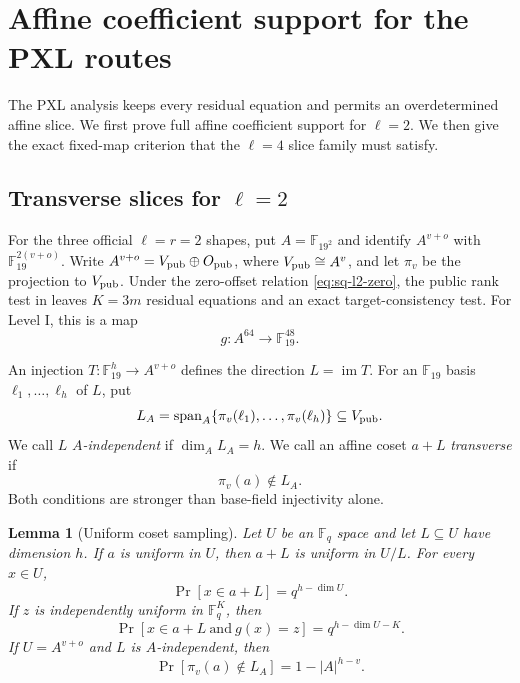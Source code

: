 \documentclass[11pt]{article}
\newtheorem{lemma}[lemma]{Lemma}
\newcommand{\F}{\mathbb F}
\newcommand{\Span}{\operatorname{span}}
\newcommand{\im}{\operatorname{im}}
\begin{document}
\section{Affine coefficient support for the PXL routes}
\label{sec:pxl-support}

The PXL analysis keeps every residual equation and permits an
overdetermined affine slice.  We first prove full affine coefficient support
for $\ell=2$.  We then give the exact fixed-map criterion that the
$\ell=4$ slice family must satisfy.

\subsection{Transverse slices for \texorpdfstring{$\ell=2$}{ell=2}}
\label{sec:pxl-l2-slice}

For the three official $\ell=r=2$ shapes, put
$A=\F_{19^2}$ and identify $A^{v+o}$ with
$\F_{19}^{2(v+o)}$.  Write
$A^{v+o}=V_{\rm pub}\oplus O_{\rm pub}$, where
$V_{\rm pub}\cong A^v$, and let $\pi_v$ be the projection to
$V_{\rm pub}$.  Under the zero-offset relation
\eqref{eq:sq-l2-zero}, the public rank test in
 leaves $K=3m$ residual equations and an exact
target-consistency test.  For Level I, this is a map
\begin{equation}
 g:A^{64}\longrightarrow\F_{19}^{48}.              \label{eq:pxl-level1-residual}
\end{equation}

An injection $T:\F_{19}^{h}\to A^{v+o}$ defines the direction
$L=\im T$.  For an $\F_{19}$ basis
$\ell_1,\ldots,\ell_h$ of $L$, put
\begin{equation}
 L_A=\Span_A\{\pi_v(\ell_1),\ldots,\pi_v(\ell_h)\}
 \subseteq V_{\rm pub}.                              \label{eq:pxl-extension-span}
\end{equation}
We call $L$ \emph{$A$-independent} if $\dim_A L_A=h$.  We call an affine
coset $a+L$ \emph{transverse} if
\begin{equation}
 \pi_v(a)\notin L_A.                                 \label{eq:pxl-l2-transverse}
\end{equation}
Both conditions are stronger than base-field injectivity alone.

\begin{lemma}[Uniform coset sampling]
\label{lem:pxl-uniform-coset}
Let $U$ be an $\F_q$ space and let $L\subseteq U$ have dimension $h$.
If $a$ is uniform in $U$, then $a+L$ is uniform in $U/L$.  For every
$x\in U$,
\begin{equation}
 \Pr[x\in a+L]=q^{h-\dim U}.                         \label{eq:pxl-point-in-coset}
\end{equation}
If $z$ is independently uniform in $\F_q^K$, then
\begin{equation}
 \Pr[x\in a+L\ \text{and}\ g(x)=z]
 =q^{h-\dim U-K}.                                    \label{eq:pxl-point-root}
\end{equation}
If $U=A^{v+o}$ and $L$ is $A$-independent, then
\begin{equation}
 \Pr[\pi_v(a)\notin L_A]=1-|A|^{h-v}.               \label{eq:pxl-transverse-probability}
\end{equation}
\end{lemma}
\end{document}
